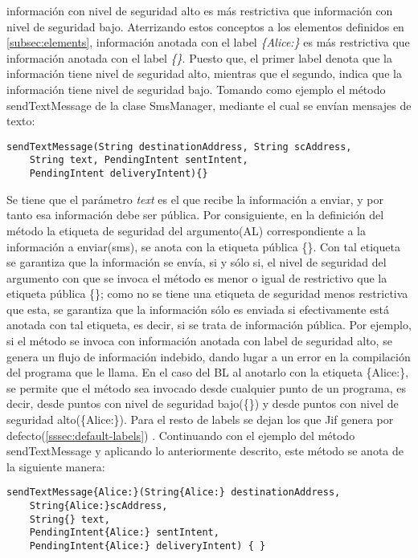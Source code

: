 información con nivel de seguridad alto es más restrictiva que información con nivel de
seguridad bajo.
Aterrizando estos conceptos a los elementos definidos en 
\ref{subsec:elements}, información anotada con el label \emph{\{Alice:\}} es
más restrictiva que información anotada con el label \emph{\{\}}. Puesto que, el
primer label denota que la información tiene nivel de seguridad alto, mientras
que el segundo, indica que la información tiene nivel de seguridad bajo.\newline 
Tomando como ejemplo el método sendTextMessage de la clase SmsManager, mediante
el cual se envían mensajes de texto:
\begin{lstlisting}[basicstyle=\scriptsize]
sendTextMessage(String destinationAddress, String scAddress, 
	String text, PendingIntent sentIntent, 
	PendingIntent deliveryIntent){}
\end{lstlisting}

Se tiene que el parámetro \emph{text} es el que recibe la información a enviar,
y por tanto esa información debe ser pública.\newline 
Por consiguiente, en la definición del método la etiqueta de seguridad del
argumento(AL) correspondiente a la información a enviar(sms), se anota con la
etiqueta pública \{\}.
Con tal etiqueta se garantiza que la información se envía, si y sólo si, el
nivel de seguridad del argumento con que se invoca el método es menor o igual de
restrictivo que la etiqueta pública \{\}; como no se tiene una etiqueta de
seguridad menos restrictiva que esta, se garantiza que la información sólo es
enviada si efectivamente está anotada con tal etiqueta, es decir, si se trata
de información pública.\newline 
Por ejemplo,
si el método se invoca con información anotada con label de seguridad alto, se
genera un flujo de información indebido, dando lugar a un error en la
compilación del programa que le llama.\newline 
En el caso del BL al anotarlo con la etiqueta \{Alice:\}, se permite que el
método sea invocado desde cualquier punto de un programa, es decir, desde
puntos con nivel de seguridad bajo(\{\}) y desde puntos con nivel de seguridad
alto(\{Alice:\}).
Para el resto de labels se dejan los que Jif genera por
defecto(\ref{sssec:default-labels}) .\newline
Continuando con el ejemplo del método sendTextMessage y aplicando lo
anteriormente descrito, este método se anota de la siguiente manera:
\begin{lstlisting}[basicstyle=\scriptsize]
sendTextMessage{Alice:}(String{Alice:} destinationAddress, 
	String{Alice:}scAddress, 
	String{} text, 
	PendingIntent{Alice:} sentIntent,
	PendingIntent{Alice:} deliveryIntent) { }
\end{lstlisting}

